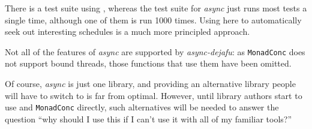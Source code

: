 There is a test suite using \dejafu{}, whereas the test suite for
\emph{async} just runs most tests a single time, although one of them
is run 1000 times. Using \dejafu{} here to automatically seek out
interesting schedules is a much more principled approach.

Not all of the features of \emph{async} are supported by
\emph{async-dejafu}: as \verb|MonadConc| does not support bound
threads, those functions that use them have been omitted.

Of course, \emph{async} is just one library, and providing an
alternative library people will have to switch to is far from
optimal. However, until library authors start to use \dejafu{} and
\verb|MonadConc| directly, such alternatives will be needed to answer
the question ``why should I use this if I can't use it with all of my
familiar tools?''
